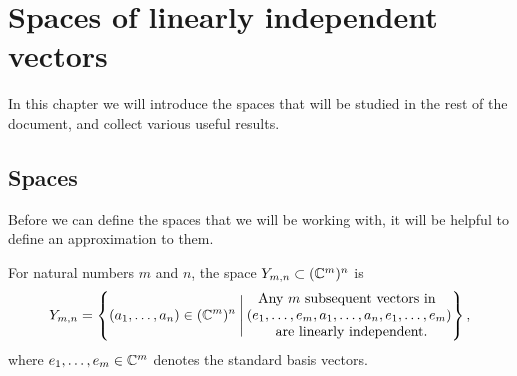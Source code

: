 



\chapter{Spaces of linearly independent vectors}
\label{chap:rum}


In this chapter we will introduce the spaces that will be studied in
the rest of the document, and collect various useful
results.

\section{Spaces} 
\label{sec:rum}
Before we can define the spaces that we will be working with, it will
be helpful to define an approximation to them.

\begin{definition} 
  For natural numbers $m$ and $n$, the space $Y_{m,n}\subset
  (\mathbb{C}^{m})^{n}$ is
  \[ Y_{m,n} = \left\{ (a_1,\dots,a_n) \in (\mathbb{C}^m)^n \:\Bigg\vert\:
    \begin{matrix}
      \text{Any } m \text{ subsequent vectors in } \\
      (e_1,\dots,e_m,a_1,\dots,a_n,e_1,\dots,e_m) \\
      \text{ are linearly independent.}
    \end{matrix}  \right\}, \]
  where $e_1,\dots,e_m \in \mathbb{C}^m$ denotes the standard basis
  vectors.
\end{definition}

